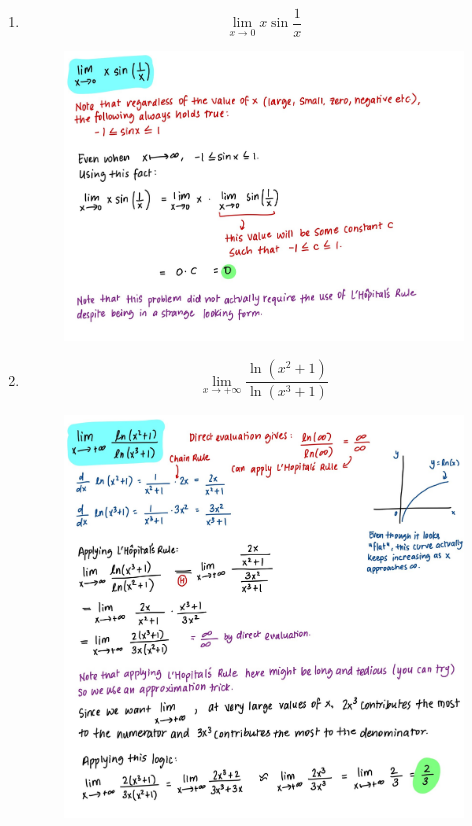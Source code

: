 \documentclass{article}
\begin{document}
\begin{enumerate}
\begin{figure}[H]
        \label{fig:Q7}
    \end{figure}
    \newpage
    \item $$\lim_{x \rightarrow 0}x\sin{\frac{1}{x}}$$
    \begin{figure}[H]
        \centering
        \includegraphics[width=0.9\linewidth]{Q8.jpg}
        \label{fig:Q8}
    \end{figure}
    \newpage
    \item $$\lim_{x\rightarrow + \infty}\frac{\ln(x^2+1)}{\ln(x^3+1)}$$
    \begin{figure}[H]
        \centering
        \includegraphics[width=\linewidth]{Q9.jpg}

\end{figure}
\end{enumerate}
\end{document}
